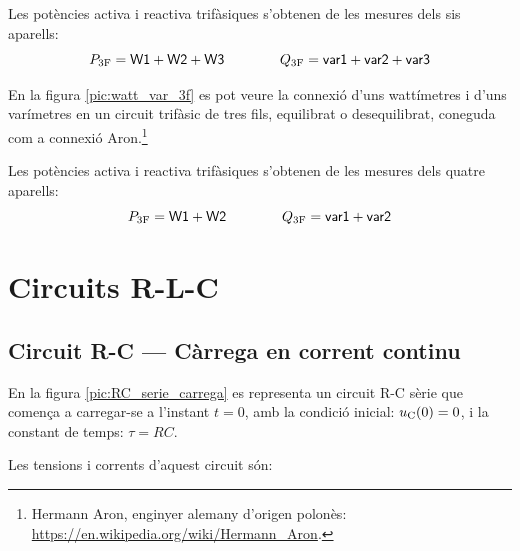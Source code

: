 Les potències activa i reactiva trifàsiques s'obtenen de les mesures
dels sis aparells:
\begin{equation}
    P_\mathrm{3F} = \textsf{W1} +  \textsf{W2} + \textsf{W3}
    \qquad\qquad Q_\mathrm{3F} = \textsf{var1} +  \textsf{var2} + \textsf{var3}
\end{equation}

En la figura \vref{pic:watt_var_3f} es pot veure la connexió d'uns
wattímetres i d'uns varímetres en un circuit trifàsic de tres fils,
equilibrat o desequilibrat, coneguda com a connexió Aron.\footnote{Hermann Aron, enginyer alemany d'origen polonès: \href{https://en.wikipedia.org/wiki/Hermann_Aron}{https:/\!\!/en.wikipedia.org/wiki/Hermann\_Aron}.}

\begin{center}
\centering
    
    \label{pic:watt_var_3f}
\end{center}

Les potències activa i reactiva trifàsiques s'obtenen de les mesures
dels quatre aparells:
\begin{equation}
    P_\mathrm{3F} = \textsf{W1} +  \textsf{W2}
    \qquad\qquad Q_\mathrm{3F} = \textsf{var1} +  \textsf{var2}
\end{equation}



\section{Circuits R-L-C}


\subsection{Circuit R-C --- Càrrega en corrent continu}\label{sec:RC-carrega}

En la figura \vref{pic:RC_serie_carrega} es representa un circuit R-C sèrie que comença a carregar-se a l'instant $t=0$, amb la condició inicial: $u_\mathrm{C}(0) = 0$, i la constant de temps: $\tau = R C$.
\begin{center}
    
    \label{pic:RC_serie_carrega}
\end{center}

Les tensions i corrents d'aquest circuit són:

